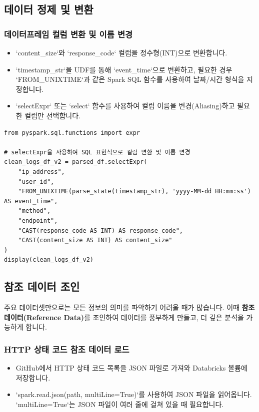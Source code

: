 \documentclass[11pt,a4paper]{article}
\begin{document}
\subsection{데이터 정제 및 변환}

\subsubsection{데이터프레임 컬럼 변환 및 이름 변경}
\begin{itemize}
    \item `content_size`와 `response_code` 컬럼을 정수형(INT)으로 변환합니다.
    \item `timestamp_str`을 UDF를 통해 `event_time`으로 변환하고, 필요한 경우 `FROM_UNIXTIME`과 같은 Spark SQL 함수를 사용하여 날짜/시간 형식을 지정합니다.
    \item `selectExpr` 또는 `select` 함수를 사용하여 컬럼 이름을 변경(Aliasing)하고 필요한 컬럼만 선택합니다.
\end{itemize}

\begin{lstlisting}
from pyspark.sql.functions import expr

# selectExpr을 사용하여 SQL 표현식으로 컬럼 변환 및 이름 변경
clean_logs_df_v2 = parsed_df.selectExpr(
    "ip_address",
    "user_id",
    "FROM_UNIXTIME(parse_state(timestamp_str), 'yyyy-MM-dd HH:mm:ss') AS event_time",
    "method",
    "endpoint",
    "CAST(response_code AS INT) AS response_code",
    "CAST(content_size AS INT) AS content_size"
)
display(clean_logs_df_v2)
\end{lstlisting}

\subsection{참조 데이터 조인}

\begin{conceptbox}
주요 데이터셋만으로는 모든 정보의 의미를 파악하기 어려울 때가 많습니다. 이때 \textbf{참조 데이터(Reference Data)}를 조인하여 데이터를 풍부하게 만들고, 더 깊은 분석을 가능하게 합니다.
\end{conceptbox}

\subsubsection{HTTP 상태 코드 참조 데이터 로드}
\begin{itemize}
    \item GitHub에서 HTTP 상태 코드 목록을 JSON 파일로 가져와 Databricks 볼륨에 저장합니다.
    \item `spark.read.json(path, multiLine=True)`를 사용하여 JSON 파일을 읽어옵니다. `multiLine=True`는 JSON 파일이 여러 줄에 걸쳐 있을 때 필요합니다.
\end{itemize}
\end{document}
